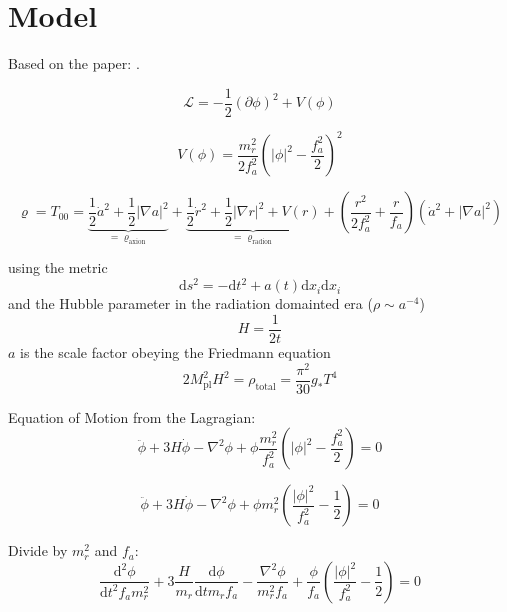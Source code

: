 \documentclass[a4paper]{article}
\begin{document}
\section{Model}

Based on the paper: \cite{axions_from_strings}.

\begin{equation}
    \mathcal{L} = - \frac{1}{2} ( \partial \phi )^2 + V(\phi)
\end{equation}

\begin{equation}
    V(\phi) = \frac{m_r^2}{2 f_a^2}\left( |\phi|^2 - \frac{f_a^2}{2} \right)^2
\end{equation}

\begin{equation}
    \varrho = T_{00} = \underbrace{\frac{1}{2} \dot{a}^2 + \frac{1}{2} | \nabla a|^2}_{= \varrho_\mathrm{axion}}
    + \underbrace{ \frac{1}{2} \dot{r}^2 + \frac{1}{2} | \nabla r|^2 + V(r) }_{= \varrho_\mathrm{radion}}
    + \left(\frac{r^2}{2 f_a^2} + \frac{r}{f_a} \right) (\dot{a}^2 + |\nabla a|^2)
\end{equation}

using the metric
\begin{equation}
    \mathrm{d}s^2 = -\mathrm{d}t^2 + a(t) \mathrm{d} x_i \mathrm{d} x_i
\end{equation}
and the Hubble parameter in the radiation domainted era ($\rho \sim a^{-4}$)
\begin{equation}
    H = \frac{1}{2t}
\end{equation}
$a$ is the scale factor obeying the Friedmann equation
\begin{equation}
    2 M_\mathrm{pl}^2 H^2 = \rho_\mathrm{total} = \frac{\pi^2}{30} g_* T^4
\end{equation}

Equation of Motion from the Lagragian:
\begin{equation}
    \ddot{\phi} + 3 H \dot{\phi} - \nabla^2 \phi + \phi \frac{m_r^2}{f_a^2} \left( |\phi|^2 - \frac{f_a^2}{2} \right) = 0
\end{equation}

\begin{equation}
    \ddot{\phi} + 3 H \dot{\phi} - \nabla^2 \phi + \phi m_r^2 \left( \frac{|\phi|^2}{f_a^2} - \frac{1}{2} \right) = 0
\end{equation}

Divide by $m_r^2$ and $f_a$:
\begin{equation}
    \frac{\mathrm{d}^2 {\phi}}{\mathrm{d} t^2 f_a m_r^2} + 3 \frac{H}{m_r} \frac{\mathrm{d} \phi}{\mathrm{d} t m_r f_a} - \frac{\nabla^2 \phi}{m_r^2 f_a} + \frac{\phi}{f_a} \left( \frac{ |\phi|^2 } { f_a^2 } - \frac{1}{2} \right) = 0
\end{equation}
\end{document}

